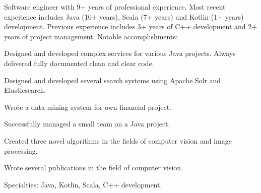 

\begin{cvparagraph}
	Software engineer with 9+ years of professional experience. Most recent experience includes Java (10+ years), Scala (7+ years) and Kotlin (1+ years) development. Previous experience includes 3+ years of C++ development and 2+ years of project management. Notable accomplishments:
      \begin{cvitems}
      \item{Designed and developed complex services for various Java projects. Always delivered fully documented clean and clear code.}
      \item{Designed and developed several search systems using Apache Solr and Elasticsearch.}
      \item{Wrote a data mining system for own financial project.}
      \item{Successfully managed a small team on a Java project.}
      \item{Created three novel algorithms in the fields of computer vision and image processing.}
      \item{Wrote several publications in the field of computer vision.}
      \end{cvitems}
      Specialties: Java, Kotlin, Scala, C++ development.
\end{cvparagraph}
